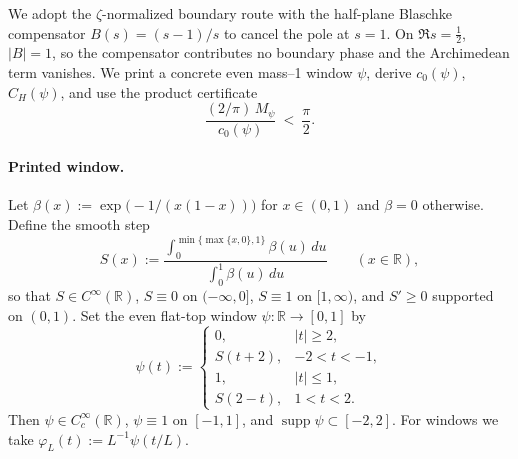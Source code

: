 \documentclass[11pt]{article}
\theoremstyle{definition}
\theoremstyle{remark}
\newcommand{\R}{\mathbb{R}}
\begin{document}
We adopt the \(\zeta\)-normalized boundary route with the half-plane Blaschke compensator \(B(s)=(s-1)/s\) to cancel the pole at \(s=1\). On \(\Re s=\tfrac12\), \(|B|=1\), so the compensator contributes no boundary phase and the Archimedean term vanishes. We print a concrete even mass--1 window \(\psi\), derive \(c_0(\psi)\), \(C_H(\psi)\), and use the product certificate
\[
  \frac{(2/\pi)\,M_\psi}{c_0(\psi)}\ <\ \frac{\pi}{2}.
\]
\paragraph{Printed window.}
Let \(\beta(x):=\exp\!\big(-1/(x(1-x))\big)\) for \(x\in(0,1)\) and \(\beta=0\) otherwise. Define the smooth step
\[
  S(x):=\frac{\int_0^{\min\{\max\{x,0\},1\}} \beta(u)\,du}{\int_0^{1} \beta(u)\,du}\qquad (x\in\R),
\]
so that \(S\in C^\infty(\R)\), \(S\equiv 0\) on \(({-}\infty,0]\), \(S\equiv1\) on \([1,\infty)\), and \(S'\ge 0\) supported on \((0,1)\). Set the even flat-top window \(\psi:\R\to[0,1]\) by
\[
  \psi(t):=\begin{cases}
    0,& |t|\ge 2,\\
    S(t+2),& -2<t<-1,\\
    1,& |t|\le 1,\\
    S(2-t),& 1<t<2.
  \end{cases}
\]
Then \(\psi\in C_c^\infty(\R)\), \(\psi\equiv 1\) on \([-1,1]\), and \(\operatorname{supp}\psi\subset[-2,2]\). For windows we take \(\varphi_L(t):=L^{-1}\psi(t/L)\).
\end{document}
